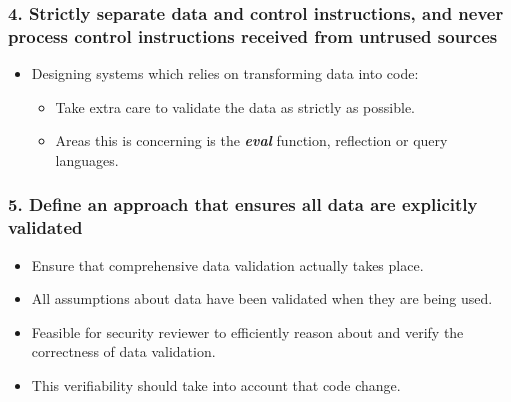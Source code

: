 \documentclass[12pt,norsk]{beamer}
\begin{document}
\begin{frame}
	\frametitle{4. Strictly separate data and control instructions, and never process control instructions received from untrused sources}
	
	\begin{itemize}
		\item Designing systems which relies on transforming data into code:
		\begin{itemize}
			\item Take extra care to validate the data as strictly as possible.
			\item Areas this is concerning is the \textit{\textbf{eval}} function, reflection or query languages.
		
		\end{itemize}
	
	\end{itemize}

\end{frame}

\begin{frame}

	\frametitle{5. Define an approach that ensures all data are explicitly validated}
	
	\begin{itemize}
		\item Ensure that comprehensive data validation actually takes place.
		\item All assumptions about data have been validated when they are being used.
		\item Feasible for security reviewer to efficiently reason about and verify the correctness of data validation.
		\item This verifiability should take into account that code change.
	
	\end{itemize}
	

\end{frame}
\end{document}
